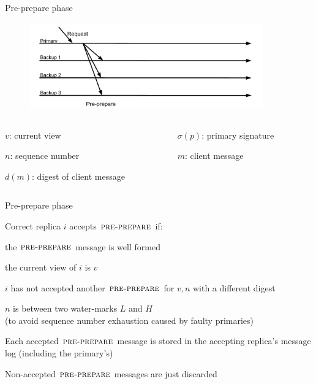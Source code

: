 \begin{frame}{Pre-prepare phase}

\begin{figure}
\includegraphics[width=0.9\textwidth, trim=0 20 0 60]{figs/14/messages1}
\end{figure}
\begin{columns}
	\begin{column}{0.5\textwidth}
	\BI
	\item $v$: current view
	\item $n$: sequence number
	\item $d(m)$: digest of client message
	\EI
	\end{column}
	\begin{column}{0.5\textwidth}
	\BI
	\item $\sigma(p)$: primary signature
	\item $m$: client message
	\EI
	\end{column}
\end{columns}



\end{frame}


\begin{frame}{Pre-prepare phase}

\BIL
\item  Correct replica $i$ accepts $\textsc{pre-prepare}$ if:
\BI
	\item the $\textsc{pre-prepare}$ message is well formed
	\item the current view of $i$ is $v$
	\item $i$ has not accepted another $\textsc{pre-prepare}$ for $v, n$ with a different digest
	\item $n$ is between two water-marks $L$ and $H$\\
			(to avoid sequence number exhaustion caused by faulty primaries)
	\EI
\item Each accepted $\textsc{pre-prepare}$ message is stored in the
accepting replica's message log (including the primary's)
\item Non-accepted $\textsc{pre-prepare}$ messages are just discarded
\EIL

\end{frame}

